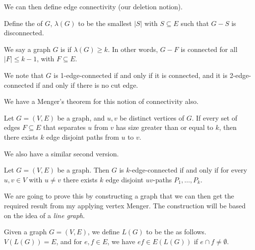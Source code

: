 \documentclass[a4paper]{scrartcl}
\begin{document}
We can then define edge connectivity (our deletion notion).

\begin{definition}
	Define the  of $G$, $\lambda(G)$ to be the smallest $|S|$ with $S \subseteq E$ such that $G - S$ is disconnected.
\end{definition}
\begin{definition}
	We say a graph $G$ is  if $\lambda(G) \geq k$. In other words, $G - F$ is connected for all $|F|\leq k - 1$, with $F \subseteq E$. 
\end{definition}

We note that $G$ is 1-edge-connected if and only if it is connected, and it is 2-edge-connected if and only if there is no cut edge.

We have a Menger's theorem for this notion of connectivity also.

\begin{theorem}
	Let $G = (V, E)$ be a graph, and $u, v$ be distinct vertices of $G$. If every set of edges $F \subseteq E$ that separates $u$ from $v$ has size greater than or equal to $k$, then there exists $k$ edge disjoint paths from $u$ to $v$.
\end{theorem}

We also have a similar second version.

\begin{theorem}
Let $G = (V, E)$ be a graph. Then $G$ is $k$-edge-connected if and only if for every $u, v \in V$ with $u \neq v$ there exists $k$ edge disjoint $uv$-paths $P_1, \dots, P_k$.
\end{theorem}

We are going to prove this by constructing a graph that we can then get the required result from my applying vertex Menger. The construction will be based on the idea of a \emph{line graph}.

\begin{definition}
	Given a graph $G = (V, E)$, we define $L(G)$ to be the  as follows.
	$V(L(G)) = E$, and for $e, f \in E$, we have $ef \in E(L(G))$ if $e \cap f \neq \emptyset$.
\end{definition}
\end{document}
